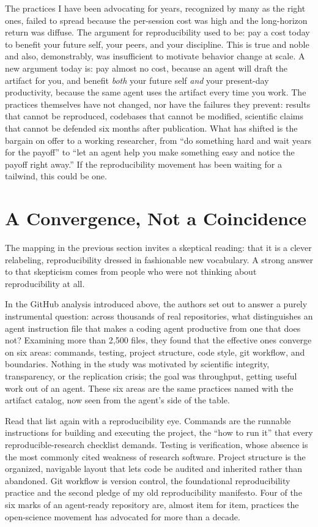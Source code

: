 \documentclass{IEEEcsmag}
\begin{document}
The practices I have been advocating for years, recognized by many as the right ones, failed to spread because the per-session cost was high and the long-horizon return was diffuse. The argument for reproducibility used to be: pay a cost today to benefit your future self, your peers, and your discipline. This is true and noble and also, demonstrably, was insufficient to motivate behavior change at scale. A new argument today is: pay almost no cost, because an agent will draft the artifact for you, and benefit \emph{both} your future self \emph{and} your present-day productivity, because the same agent uses the artifact every time you work. The practices themselves have not changed, nor have the failures they prevent: results that cannot be reproduced, codebases that cannot be modified, scientific claims that cannot be defended six months after publication. What has shifted is the bargain on offer to a working researcher, from ``do something hard and wait years for the payoff'' to ``let an agent help you make something easy and notice the payoff right away.'' If the reproducibility movement has been waiting for a tailwind, this could be one.

\section{A Convergence, Not a Coincidence}

The mapping in the previous section invites a skeptical reading: that it is a clever relabeling, reproducibility dressed in fashionable new vocabulary. A strong answer to that skepticism comes from people who were not thinking about reproducibility at all.

In the GitHub analysis introduced above, the authors set out to answer a purely instrumental question: across thousands of real repositories, what distinguishes an agent instruction file that makes a coding agent productive from one that does not? Examining more than 2,500 files, they found that the effective ones converge on six areas: commands, testing, project structure, code style, git workflow, and boundaries. Nothing in the study was motivated by scientific integrity, transparency, or the replication crisis; the goal was throughput, getting useful work out of an agent. These six areas are the same practices named with the artifact catalog, now seen from the agent's side of the table.

Read that list again with a reproducibility eye. Commands are the runnable instructions for building and executing the project, the ``how to run it'' that every reproducible-research checklist demands. Testing is verification, whose absence is the most commonly cited weakness of research software. Project structure is the organized, navigable layout that lets code be audited and inherited rather than abandoned. Git workflow is version control, the foundational reproducibility practice and the second pledge of my old reproducibility manifesto. Four of the six marks of an agent-ready repository are, almost item for item, practices the open-science movement has advocated for more than a decade.
\end{document}
